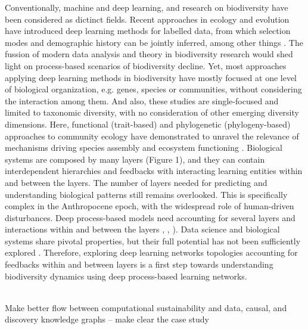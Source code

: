 \documentclass[12pt,a4paper]{article}
\begin{document}
Conventionally, machine and deep learning, and research on
biodiversity have been considered as dictinct fields. Recent
approaches in ecology and evolution have introduced deep learning
methods for labelled data, from which selection modes and demographic
history can be jointly inferred, among other things \citep{sheehan2016deep}. The fussion
of modern data analysis and theory in biodiversity research would shed
light on process-based scenarios of biodiversity decline. Yet, most approaches applying deep learning methods in biodiversity have mostly focused at one level of biological organization, e.g. genes, species
or communities, without considering the interaction among them. And
also, these studies are single-focused and limited to taxonomic
diversity, with no consideration of other emerging diversity
dimensions. Here, functional (trait-based) and phylogenetic
(phylogeny-based) approaches to community ecology have demonstrated to unravel the relevance of mechanisms driving species assembly and ecosystem functioning \citep{weiss2019unifying}. Biological systems are composed by many layers (Figure 1), and they can contain interdependent hierarchies and feedbacks with interacting learning
entities within and between the layers. The number of layers needed for predicting and understanding biological patterns still remains overlooked. This is specifically complex in the Anthropocene epoch, with the widespread role of human-driven disturbances. Deep process-based models need accounting for several layers and interactions within and between the layers \citep{fontaine2011ecological}, \citep{melian2018deciphering},
\citep{reichstein2019deep}). Data science and biological systems share
pivotal properties, but their full potential has not been sufficiently
explored \citep{schmidhuber2015deep}. Therefore, exploring deep
learning networks topologies accounting for feedbacks within and
between layers is a first step towards understanding biodiversity
dynamics using deep process-based learning networks.

\\
Make better flow between computational sustainability and data, causal, and discovery knowledge graphs -- make clear the case study
\\
\end{document}
